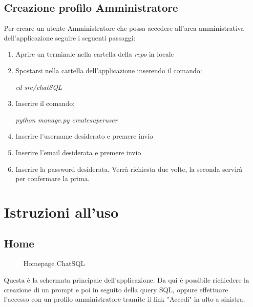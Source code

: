 \documentclass[5pt]{article}
\begin{document}
	    \subsection{Creazione profilo Amministratore}
	    Per creare un utente Amministratore che possa accedere all'area amministrativa dell'applicazione seguire i seguenti passaggi:
	    \begin{enumerate}
	    	\item Aprire un terminale nella cartella della \textit{repo} in locale
	    	\item Spostarsi nella cartella dell'applicazione inserendo il comando:
	    	\begin{center}
	    		\textit{cd src/chatSQL}
	    	\end{center}
	    	\item Inserire il comando:
	    	\begin{center}
	    		\textit{python manage.py createsuperuser}
	    	\end{center}
	    	\item Inserire l'username desiderato e premere invio
	    	\item Inserire l'email desiderata e premere invio
	    	\item Inserire la password desiderata. Verrà richiesta due volte, la seconda servirà per confermare la prima.
	    \end{enumerate}
    
    \section{Istruzioni all'uso}
	    \subsection{Home}
	    \begin{figure}[ht]
	    	\centering
	    	\caption{Homepage ChatSQL}
	    \end{figure}
	    Questa è la schermata principale dell'applicazione. Da qui è possibile richiedere la creazione di un prompt e poi in seguito della query SQL, oppure effettuare l'accesso con un profilo amministratore tramite il link "Accedi" in alto a sinistra.
	    
\end{document}

